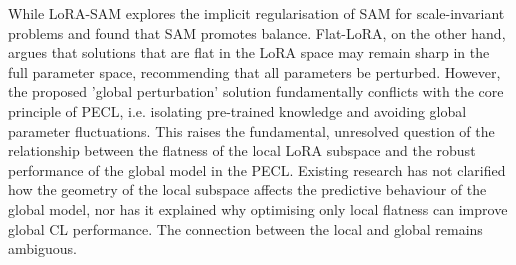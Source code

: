 \documentclass{article} %
\begin{document}
  While LoRA-SAM\cite{NEURIPS2024_4eb2c0ad} explores the implicit regularisation of SAM for scale-invariant problems and found that SAM promotes balance. Flat-LoRA\cite{li2025flatloralowrankadaptationflat}, on the other hand, argues that solutions that are flat in the LoRA space may remain sharp in the full parameter space, recommending that all parameters be perturbed. However, the proposed 'global perturbation' solution fundamentally conflicts with the core principle of PECL, i.e. isolating pre-trained knowledge and avoiding global parameter fluctuations. This raises the fundamental, unresolved question of the relationship between the flatness of the local LoRA subspace and the robust performance of the global model in the PECL. Existing research has not clarified how the geometry of the local subspace affects the predictive behaviour of the global model, nor has it explained why optimising only local flatness can improve global CL performance. The connection between the local and global remains ambiguous.

  
 
 



 
\end{document}
